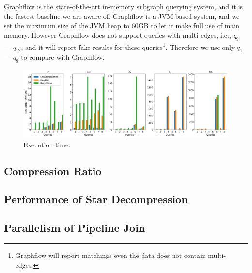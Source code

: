 Graphflow is the state-of-the-art in-memory subgraph querying system,
and it is the fastest baseline we are aware of.
Graphflow is a JVM based system, and we set the maximum size of the JVM heap to 60GB to let it make full use of main memory.
However Graphflow does not support queries with multi-edges, i.e., $q_9$ --- $q_{12}$,
and it will report fake results for these queries\footnote{Graphflow will report matchings even the data does not contain multi-edges.}.
Therefore we use only $q_1$ --- $q_8$ to compare with Graphflow.
\begin{figure}[ht]
  \centering
  \includegraphics[width=\textwidth]{img/exp_compare.pdf}
  \caption{Execution time.}\label{img:exp_compare}
\end{figure}

\subsection{Compression Ratio}\label{sec:experiments_compress}
\subsection{Performance of Star Decompression}
\subsection{Parallelism of Pipeline Join}
